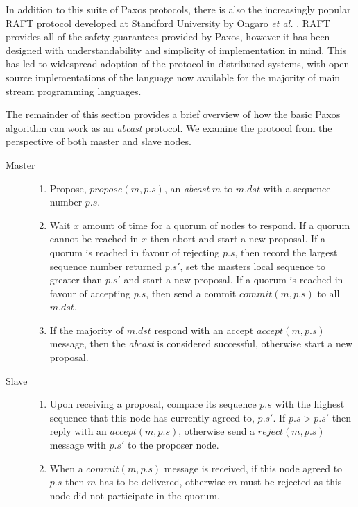 		In addition to this suite of Paxos protocols, there is also the increasingly popular RAFT protocol developed at Standford University by Ongaro \emph{et al.} \citep{Ongaro:2014:SUC:2643634.2643666}.  RAFT provides all of the safety guarantees provided by Paxos, however it has been designed with understandability and simplicity of implementation in mind.  This has led to widespread adoption of the protocol in distributed systems, with open source implementations of the language now available for the majority of main stream programming languages.  
		
		The remainder of this section provides a brief overview of how the basic Paxos algorithm can work as an \emph{abcast} protocol.  We examine the protocol from the perspective of both master and slave nodes.  
		
		\begin{description}
		    \item[Master] \hfill
			    \begin{enumerate}
		  			\item Propose, $propose(m, p.s)$, an \emph{abcast} $m$ to $m.dst$ with a sequence number $p.s$.
		  			\item Wait $x$ amount of time for a quorum of nodes to respond.  If a quorum cannot be reached in $x$ then abort and start a new proposal.  If a quorum is reached in favour of rejecting $p.s$, then record the largest sequence number returned $p.s'$, set the masters local sequence to greater than $p.s'$ and start a new proposal.  If a quorum is reached in favour of accepting $p.s$, then send a commit $commit(m, p.s)$ to all $m.dst$.  
		  			\item If the majority of $m.dst$ respond with an accept $accept(m, p.s)$ message, then the \emph{abcast} is considered successful, otherwise start a new proposal.  
			\end{enumerate}
			
			
			\item[Slave] \hfill
				\begin{enumerate}
		  			\item Upon receiving a proposal, compare its sequence $p.s$ with the highest sequence that this node has currently agreed to, $p.s'$.  If $p.s > p.s'$ then reply with an $accept(m, p.s)$, otherwise send a $reject(m, p.s)$ message with $p.s'$ to the proposer node.  
		  			\item When a $commit(m, p.s)$ message is received, if this node agreed to $p.s$ then $m$ has to be delivered, otherwise $m$ must be rejected as this node did not participate in the quorum.  
				\end{enumerate}		
		\end{description}
		
